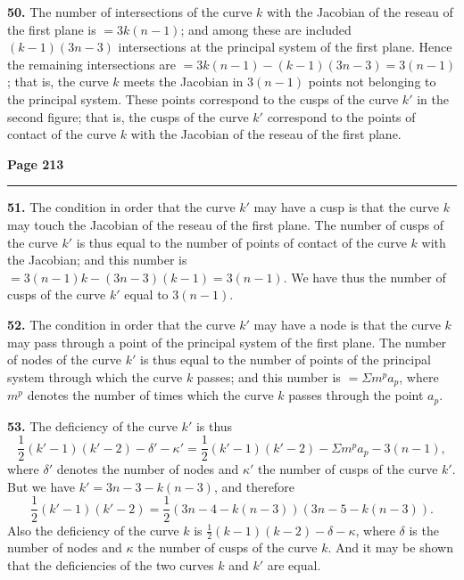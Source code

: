 \documentclass[12pt,a4paper]{article}
\theoremstyle{plain}
\theoremstyle{definition}
\theoremstyle{remark}
\begin{document}
\textbf{50.} The number of intersections of the curve $k$ with the Jacobian of the reseau of the first plane is $= 3k(n - 1)$; and among these are included $(k - 1)(3n - 3)$ intersections at the principal system of the first plane. Hence the remaining intersections are $= 3k(n - 1) - (k - 1)(3n - 3) = 3(n - 1)$; that is, the curve $k$ meets the Jacobian in $3(n - 1)$ points not belonging to the principal system. These points correspond to the cusps of the curve $k'$ in the second figure; that is, the cusps of the curve $k'$ correspond to the points of contact of the curve $k$ with the Jacobian of the reseau of the first plane.

\newpage
\noindent\textbf{Page 213}\\
\noindent\rule{\textwidth}{0.4pt}

\smallskip

\noindent\textbf{51.} The condition in order that the curve $k'$ may have a cusp is that the curve $k$ may touch the Jacobian of the reseau of the first plane. The number of cusps of the curve $k'$ is thus equal to the number of points of contact of the curve $k$ with the Jacobian; and this number is $= 3(n - 1)k - (3n - 3)(k - 1) = 3(n - 1)$. We have thus the number of cusps of the curve $k'$ equal to $3(n - 1)$.

\textbf{52.} The condition in order that the curve $k'$ may have a node is that the curve $k$ may pass through a point of the principal system of the first plane. The number of nodes of the curve $k'$ is thus equal to the number of points of the principal system through which the curve $k$ passes; and this number is $= \Sigma m^p a_p$, where $m^p$ denotes the number of times which the curve $k$ passes through the point $a_p$.

\textbf{53.} The deficiency of the curve $k'$ is thus
\[
\frac{1}{2}(k' - 1)(k' - 2) - \delta' - \kappa' = \frac{1}{2}(k' - 1)(k' - 2) - \Sigma m^p a_p - 3(n - 1),
\]
where $\delta'$ denotes the number of nodes and $\kappa'$ the number of cusps of the curve $k'$. But we have $k' = 3n - 3 - k(n - 3)$, and therefore
\[
\frac{1}{2}(k' - 1)(k' - 2) = \frac{1}{2}(3n - 4 - k(n - 3))(3n - 5 - k(n - 3)).
\]
Also the deficiency of the curve $k$ is $\frac{1}{2}(k - 1)(k - 2) - \delta - \kappa$, where $\delta$ is the number of nodes and $\kappa$ the number of cusps of the curve $k$. And it may be shown that the deficiencies of the two curves $k$ and $k'$ are equal.
\end{document}
